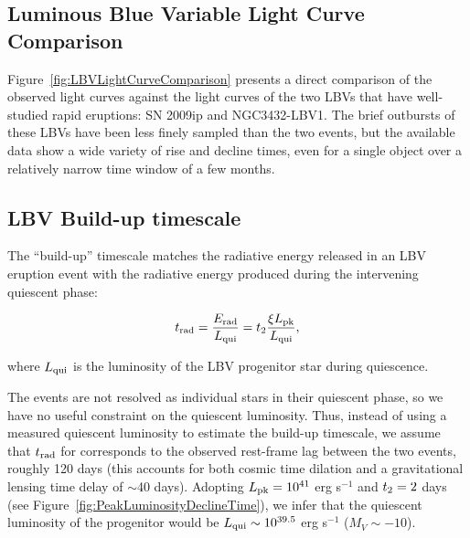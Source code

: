 \subsection{Luminous Blue Variable Light Curve Comparison}
\label{sec:LBVlightcurves}

Figure~\ref{fig:LBVLightCurveComparison} presents a direct comparison
of the observed \spock light curves against the light curves of the
two LBVs that have well-studied rapid eruptions: SN 2009ip and
NGC3432-LBV1. The brief outbursts of these LBVs have been less finely
sampled than the two \spock events, but the available data show a wide
variety of rise and decline times, even for a single object over a
relatively narrow time window of a few months.



\subsection{LBV Build-up timescale}\label{sec:LBVbuildup}

The ``build-up'' timescale \citep{Smith:2011b} matches the radiative
energy released in an LBV eruption event with the radiative energy
produced during the intervening quiescent phase:

\begin{equation}
  \label{eqn:trad}
t_{\rm rad} = \frac{E_{\rm rad}}{L_{\rm qui}} = \t2 \frac{\xi\Lpk}{L_{\rm qui}},
\end{equation}

\noindent where $L_{\rm qui}$ is the luminosity of the LBV progenitor
star during quiescence.

The \spock events are not resolved as individual stars in their
quiescent phase, so we have no useful constraint on the quiescent
luminosity. Thus, instead of using a measured quiescent luminosity to
estimate the build-up timescale, we assume that $t_{\rm rad}$ for
\spock corresponds to the observed rest-frame lag between the two
events, roughly 120 days (this accounts for both cosmic time dilation
and a gravitational lensing time delay of $\sim$40 days). Adopting
$L_{\rm pk}=10^{41}$ erg s$^{-1}$ and $\t2=2$ days (see
Figure~\ref{fig:PeakLuminosityDeclineTime}), we infer that the
quiescent luminosity of the \spock progenitor would be $L_{\rm
  qui}\sim10^{39.5}$ erg s$^{-1}$ ($M_V\sim-10$).


